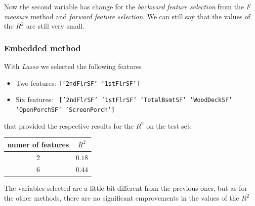 \documentclass[a4paper,oneside,12pt]{article}
\begin{document}
Now the second variable has change for the \textit{backward feature selection} from the \textit{F measure} method and \textit{forward feature selection}. We can still say that the values of the $R^2$ are still very small.

\subsubsection{Embedded method}

With \textit{Lasso} we selected the following features 

\begin{itemize}
\item Two features: \texttt{['2ndFlrSF' '1stFlrSF']} 
\item Six features:  \texttt{ ['2ndFlrSF' '1stFlrSF' 'TotalBsmtSF' 'WoodDeckSF' 'OpenPorchSF' 'ScreenPorch']}
\end{itemize}

that provided the respective results for the $R^2$ on the test set:
\begin{table}[H]
\centering
\begin{tabular}{|c|c|}
\hline
numer of features & $R^2$ \\
\hline
2  & $0.18$ \\
\hline
6  & $0.44$ \\
\hline

\end{tabular}
\end{table}

The variables selected are a little bit different from the previous ones, but as for the other methods, there are no significant emprovements in the values of the $R^2$
\end{document}
